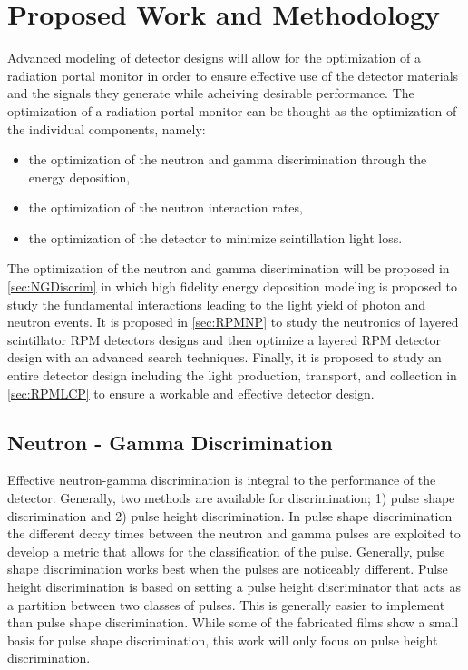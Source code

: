 \chapter{Proposed Work and Methodology}
\label{ch:ProposedWorkAndMethodology}
Advanced modeling of detector designs will allow for the optimization of a radiation portal monitor in order to ensure effective use of the detector materials and the signals they generate while acheiving desirable performance.
The optimization of a radiation portal monitor can be thought as the optimization of the individual components, namely:
\begin{itemize}
  \item the optimization of the neutron and gamma discrimination through the energy deposition,
  \item the optimization of the neutron interaction rates,
  \item the optimization of the detector to minimize scintillation light loss.
\end{itemize}
The optimization of the neutron and gamma discrimination will be proposed in \autoref{sec:NGDiscrim} in which high fidelity energy deposition modeling is proposed to study the fundamental interactions leading to the light yield of photon and neutron events.
It is proposed in \autoref{sec:RPMNP} to study the neutronics of layered scintillator RPM detectors designs and then optimize a layered RPM detector design with an advanced search techniques.
Finally, it is proposed to study an entire detector design including the light production, transport, and collection in \autoref{sec:RPMLCP} to ensure a workable and effective detector design.

\section{Neutron - Gamma Discrimination}
\label{sec:NGDiscrim}

Effective neutron-gamma discrimination is integral to the performance of the detector.
Generally, two methods are available for discrimination; 1) pulse shape discrimination and 2) pulse height discrimination.
In pulse shape discrimination the different decay times between the neutron and gamma pulses are exploited to develop a metric that allows for the classification of the pulse.
Generally, pulse shape discrimination works best when the pulses are noticeably different.
Pulse height discrimination is based on setting a pulse height discriminator that acts as a partition between two classes of pulses.
This is generally easier to implement than pulse shape discrimination.
While some of the fabricated films show a small basis for pulse shape discrimination, this work will only focus on pulse height discrimination.

